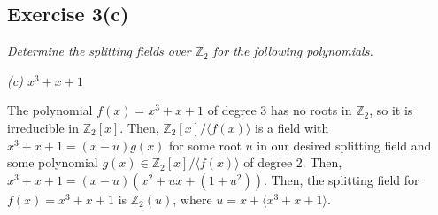 \subsection*{Exercise 3(c)}
\textit{Determine the splitting fields over $\mathbb{Z}_2$ for the following polynomials.}

\textit{(c) $x^3 + x + 1$}

\vspace{5 mm}
The polynomial $f(x) = x^3 + x + 1$ of degree 3 has no roots in $\mathbb{Z}_2$, so it is irreducible in $\mathbb{Z}_2[x]$. Then, $\mathbb{Z}_2[x]/\langle f(x) \rangle$ is a field with $x^3 + x + 1 = (x - u)g(x)$ for some root $u$ in our desired splitting field and some polynomial $g(x) \in \mathbb{Z}_2[x]/\langle f(x) \rangle$ of degree 2. Then, $x^3 + x + 1 = (x - u)(x^2 + ux + (1+u^2))$. Then, the splitting field for $f(x) = x^3 + x + 1$ is $\mathbb{Z}_2(u)$, where $u = x + \langle x^3 + x + 1 \rangle$.